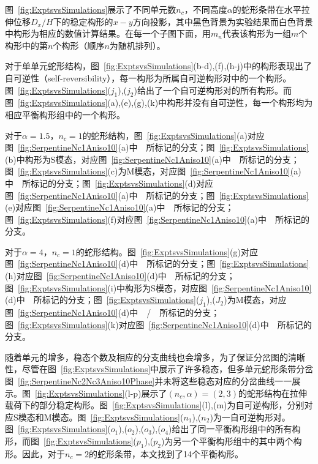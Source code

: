 图~\ref{fig:ExptsvsSimulations}展示了不同单元数$n_c$，不同高度$\alpha$的蛇形条带在水平拉伸位移$D_x/H$下的稳定构形的$x-y$方向投影，其中黑色背景为实验结果而白色背景中构形为相应的数值计算结果。在每一个子图下面，用$m_n$代表该构形为一组$m$个构形中的第$n$个构形（顺序$n$为随机排列）。

对于单单元蛇形结构，图~\ref{fig:ExptsvsSimulations}(b-d),(f),(h-j)中的构形表现出了自可逆性（self-reversibility），每一构形为所属自可逆构形对中的一个构形。图~\ref{fig:ExptsvsSimulations}($j_1$),($j_2$)给出了一个自可逆构形对的所有构形。而图~\ref{fig:ExptsvsSimulations}(a),(e),(g),(k)中构形并没有自可逆性，每一个构形均为相应平衡构形组中的一个构形。

对于$\alpha=1.5$，$n_c=1$的蛇形结构，图~\ref{fig:ExptsvsSimulations}(a)对应图~\ref{fig:SerpentineNc1Aniso10}(a)中~\Brighttriangle~所标记的分支；图~\ref{fig:ExptsvsSimulations}(b)中构形为S模态，对应图~\ref{fig:SerpentineNc1Aniso10}(a)中~\bluesquare~所标记的分支；图~\ref{fig:ExptsvsSimulations}(c)为M模态，对应图~\ref{fig:SerpentineNc1Aniso10}(a)中~\Btriangle~所标记的分支；图~\ref{fig:ExptsvsSimulations}(d)对应图~\ref{fig:SerpentineNc1Aniso10}(a)中~\Bdiamond~所标记的分支；图~\ref{fig:ExptsvsSimulations}(e)对应图~\ref{fig:SerpentineNc1Aniso10}(a)中~\HBrighttriangle~所标记的分支；图~\ref{fig:ExptsvsSimulations}(f)对应图~\ref{fig:SerpentineNc1Aniso10}(a)中~\Bstarshape~所标记的分支。

对于$\alpha=4$，$n_c=1$的蛇形结构。图~\ref{fig:ExptsvsSimulations}(g)对应图~\ref{fig:SerpentineNc1Aniso10}(d)中~\Brighttriangle~所标记的分支；图~\ref{fig:ExptsvsSimulations}(h)对应图~\ref{fig:SerpentineNc1Aniso10}(d)中~\Bdiamond~所标记的分支；图~\ref{fig:ExptsvsSimulations}(i)中构形为S模态，对应图~\ref{fig:SerpentineNc1Aniso10}(d)中~\bluesquare~所标记的分支；图~\ref{fig:ExptsvsSimulations}($j_1$),($J_2$)为M模态，对应图~\ref{fig:SerpentineNc1Aniso10}(d)中~\Btriangle~/~\Rtriangle~所标记的分支；图~\ref{fig:ExptsvsSimulations}(k)对应图~\ref{fig:SerpentineNc1Aniso10}(d)中~\HBrighttriangle~所标记的分支。

随着单元的增多，稳态个数及相应的分支曲线也会增多，为了保证分岔图的清晰性，尽管在图~\ref{fig:ExptsvsSimulations}中展示了许多稳态，但多单元蛇形条带分岔图~\ref{fig:SerpentineNc2Nc3Aniso10Phase}并未将这些稳态对应的分岔曲线一一展示。图~\ref{fig:ExptsvsSimulations}(l-p)展示了$(n_c,\alpha)=(2,3)$的蛇形结构在拉伸载荷下的部分稳定构形。图~\ref{fig:ExptsvsSimulations}(l),(m)为自可逆构形，分别对应S模态和M模态。图~\ref{fig:ExptsvsSimulations}($n_1$),($n_2$)为一自可逆构形对。图~\ref{fig:ExptsvsSimulations}($o_1$),($o_2$),($o_3$),($o_4$)给出了同一平衡构形组中的所有构形，而图~\ref{fig:ExptsvsSimulations}($p_1$),($p_2$)为另一个平衡构形组中的其中两个构形。因此，对于$n_c=2$的蛇形条带，本文找到了14个平衡构形。

